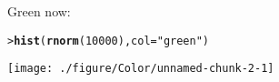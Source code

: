\documentclass{article}\usepackage[]{graphicx}\usepackage[]{color}
\makeatletter
\def\maxwidth{ %
  \ifdim\Gin@nat@width>\linewidth
    \linewidth
  \else
    \Gin@nat@width
  \fi
}
\newcommand{\hlnum}[1]{\textcolor[rgb]{0.686,0.059,0.569}{#1}}%
\newcommand{\hlstr}[1]{\textcolor[rgb]{0.192,0.494,0.8}{#1}}%
\newcommand{\hlstd}[1]{\textcolor[rgb]{0.345,0.345,0.345}{#1}}%
\newcommand{\hlkwc}[1]{\textcolor[rgb]{0.333,0.667,0.333}{#1}}%
\newcommand{\hlkwd}[1]{\textcolor[rgb]{0.737,0.353,0.396}{\textbf{#1}}}%
\newenvironment{kframe}{%
 \def\at@end@of@kframe{}%
 \ifinner\ifhmode%
  \def\at@end@of@kframe{\end{minipage}}%
  \begin{minipage}{\columnwidth}%
 \fi\fi%
 \def\FrameCommand##1{\hskip\@totalleftmargin \hskip-\fboxsep
 \colorbox{shadecolor}{##1}\hskip-\fboxsep
     \hskip-\linewidth \hskip-\@totalleftmargin \hskip\columnwidth}%
 \MakeFramed {\advance\hsize-\width
   \@totalleftmargin\z@ \linewidth\hsize
   \@setminipage}}%
 {\par\unskip\endMakeFramed%
 \at@end@of@kframe}
\newenvironment{knitrout}{}{} %
\makeatother
\begin{document}
Green now:

\begin{knitrout}
\color{fgcolor}\begin{kframe}
\begin{alltt}
\hlstd{> }\hlkwd{hist}\hlstd{(}\hlkwd{rnorm}\hlstd{(}\hlnum{10000}\hlstd{),} \hlkwc{col} \hlstd{=} \hlstr{"green"}\hlstd{)}
\end{alltt}
\end{kframe}
\texttt{[image: ./figure/Color/unnamed-chunk-2-1]} 

\end{knitrout}
\end{document}
